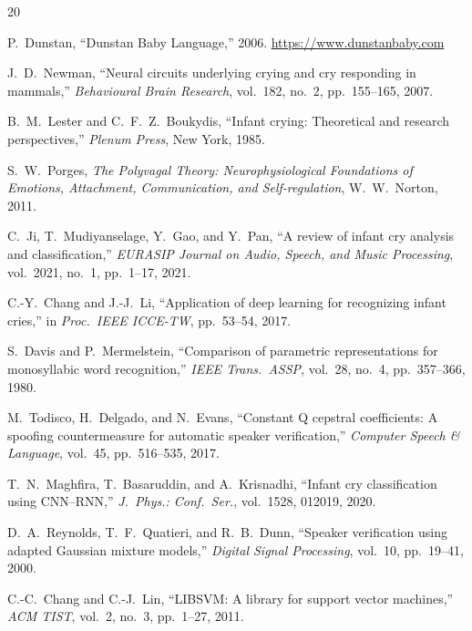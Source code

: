 \documentclass[11pt,a4paper]{article}
\begin{document}

\begin{thebibliography}{20}

P.~Dunstan,
``Dunstan Baby Language,'' 2006.
\url{https://www.dunstanbaby.com}

J.~D.~Newman,
``Neural circuits underlying crying and cry responding in mammals,''
\textit{Behavioural Brain Research}, vol.~182, no.~2, pp.~155--165, 2007.

B.~M.~Lester and C.~F.~Z.~Boukydis,
``Infant crying: Theoretical and research perspectives,''
\textit{Plenum Press}, New York, 1985.

S.~W.~Porges,
\textit{The Polyvagal Theory: Neurophysiological Foundations of
Emotions, Attachment, Communication, and Self-regulation},
W.~W.~Norton, 2011.

C.~Ji, T.~Mudiyanselage, Y.~Gao, and Y.~Pan,
``A review of infant cry analysis and classification,''
\textit{EURASIP Journal on Audio, Speech, and Music Processing},
vol.~2021, no.~1, pp.~1--17, 2021.

C.-Y.~Chang and J.-J.~Li,
``Application of deep learning for recognizing infant cries,''
in \textit{Proc.\ IEEE ICCE-TW}, pp.~53--54, 2017.

S.~Davis and P.~Mermelstein,
``Comparison of parametric representations for monosyllabic word
recognition,''
\textit{IEEE Trans.\ ASSP}, vol.~28, no.~4, pp.~357--366, 1980.

M.~Todisco, H.~Delgado, and N.~Evans,
``Constant Q cepstral coefficients: A spoofing countermeasure for
automatic speaker verification,''
\textit{Computer Speech \& Language}, vol.~45, pp.~516--535, 2017.

T.~N.~Maghfira, T.~Basaruddin, and A.~Krisnadhi,
``Infant cry classification using CNN--RNN,''
\textit{J.\ Phys.: Conf.\ Ser.}, vol.~1528, 012019, 2020.

D.~A.~Reynolds, T.~F.~Quatieri, and R.~B.~Dunn,
``Speaker verification using adapted Gaussian mixture models,''
\textit{Digital Signal Processing}, vol.~10, pp.~19--41, 2000.

C.-C.~Chang and C.-J.~Lin,
``LIBSVM: A library for support vector machines,''
\textit{ACM TIST}, vol.~2, no.~3, pp.~1--27, 2011.


\end{thebibliography}
\end{document}
